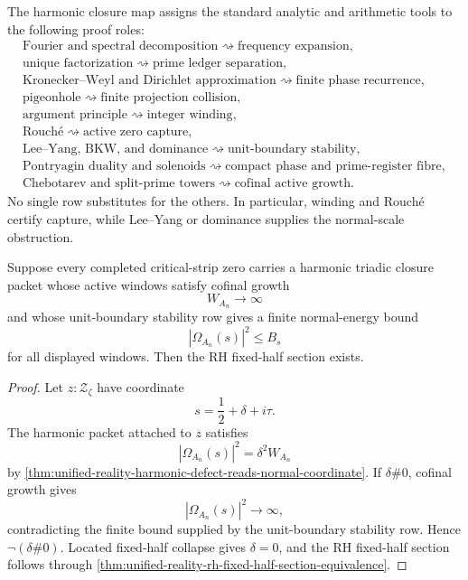 \begin{definition}
\label{def:unified-reality-harmonic-proof-roles}
The harmonic closure map assigns the standard analytic and arithmetic
tools to the following proof roles:
$$
\begin{gathered}
\text{Fourier and spectral decomposition}
\rightsquigarrow
\text{frequency expansion},\\
\text{unique factorization}
\rightsquigarrow
\text{prime ledger separation},\\
\text{Kronecker--Weyl and Dirichlet approximation}
\rightsquigarrow
\text{finite phase recurrence},\\
\text{pigeonhole}
\rightsquigarrow
\text{finite projection collision},\\
\text{argument principle}
\rightsquigarrow
\text{integer winding},\\
\text{Rouch\'e}
\rightsquigarrow
\text{active zero capture},\\
\text{Lee--Yang, BKW, and dominance}
\rightsquigarrow
\text{unit-boundary stability},\\
\text{Pontryagin duality and solenoids}
\rightsquigarrow
\text{compact phase and prime-register fibre},\\
\text{Chebotarev and split-prime towers}
\rightsquigarrow
\text{cofinal active growth}.
\end{gathered}
$$
No single row substitutes for the others.  In particular, winding and
Rouch\'e certify capture, while Lee--Yang or dominance supplies the
normal-scale obstruction.
\end{definition}

\begin{theorem}
\label{thm:unified-reality-harmonic-triadic-closure-conditionally-sufficient}
Suppose every completed critical-strip zero carries a harmonic triadic
closure packet whose active windows satisfy cofinal growth
$$
W_{A_n}\to\infty
$$
and whose unit-boundary stability row gives a finite normal-energy bound
$$
|\Omega_{A_n}(s)|^2\le B_s
$$
for all displayed windows.  Then the RH fixed-half section exists.
\end{theorem}

\begin{proof}
Let $z:\mathcal Z_{\zeta}$ have coordinate
$$
s=\frac12+\delta+i\tau.
$$
The harmonic packet attached to $z$ satisfies
$$
|\Omega_{A_n}(s)|^2=\delta^2W_{A_n}
$$
by
\autoref{thm:unified-reality-harmonic-defect-reads-normal-coordinate}.
If $\delta\#0$, cofinal growth gives
$$
|\Omega_{A_n}(s)|^2\to\infty,
$$
contradicting the finite bound supplied by the unit-boundary stability
row.  Hence $\neg(\delta\#0)$.  Located fixed-half collapse gives
$\delta=0$, and the RH fixed-half section follows through
\autoref{thm:unified-reality-rh-fixed-half-section-equivalence}.
\end{proof}

